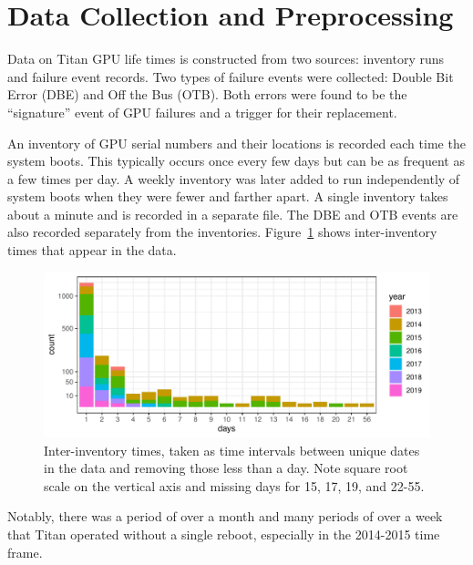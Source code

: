 \section{Data Collection and Preprocessing}
\label{section:dataprep}
Data on Titan GPU life times is constructed from two sources:
inventory runs and failure event records. Two types of failure events
were collected: Double Bit Error (DBE) and Off the Bus (OTB). Both
errors were found to be the ``signature'' event of GPU failures and a
trigger for their replacement.

An inventory of GPU serial numbers and their locations is recorded
each time the system boots. This typically occurs once every few days
but can be as frequent as a few times per day. A weekly inventory was
later added to run independently of system boots when they were fewer
and farther apart. A single inventory takes about a minute and is
recorded in a separate file. The DBE and OTB events are also recorded
separately from the inventories.  Figure~\ref{fig:inventory} shows
inter-inventory times that appear in the data.
\begin{figure}[bt]
  \begin{center}
    \includegraphics[width=\columnwidth]{figs/attention_intervals001.pdf}
  \end{center}
  \caption{Inter-inventory times, taken as time intervals between
    unique dates in the data and removing those less than a day. Note
    square root scale on the vertical axis and missing days for 15,
    17, 19, and 22-55.}
  \label{fig:inventory}
\end{figure}
Notably, there was a period of over a month and many periods of over a
week that Titan operated without a single reboot, especially in the
2014-2015 time frame.

